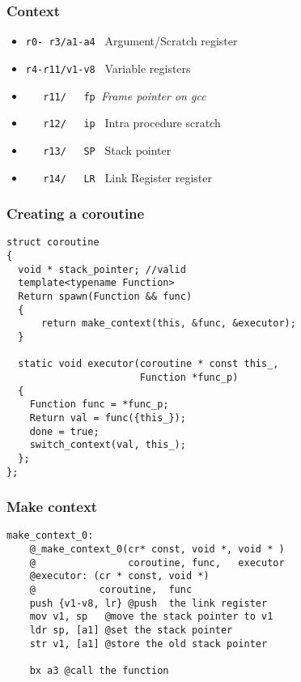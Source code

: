 \documentclass{beamer}
\begin{document}
\begin{frame}[fragile]
\frametitle{Context}
\begin{itemize}
\item<1-> \lstinline[columns=fixed]{r0- r3/a1-a4 } Argument/Scratch register
\item<2-> \lstinline[columns=fixed]{r4-r11/v1-v8 } Variable registers
\item<3-> \lstinline[columns=fixed]{   r11/   fp }\textit{Frame pointer on gcc}
\item<4-> \lstinline[columns=fixed]{   r12/   ip } Intra procedure scratch 
\item<5-> \lstinline[columns=fixed]{   r13/   SP } Stack pointer
\item<6-> \lstinline[columns=fixed]{   r14/   LR } Link Register
register
\end{itemize}
\end{frame}

\begin{frame}[fragile]
\frametitle{Creating a coroutine}

\begin{block}{}
\begin{lstlisting}[basicstyle=\small]
struct coroutine
{
  void * stack_pointer; //valid
  template<typename Function>
  Return spawn(Function && func)
  {
      return make_context(this, &func, &executor);
  }

  static void executor(coroutine * const this_, 
                       Function *func_p)
  {
    Function func = *func_p;
    Return val = func({this_});
    done = true;
    switch_context(val, this_);
  };  
};
\end{lstlisting}
\end{block}
\end{frame}


\begin{frame}[fragile]
\frametitle{Make context}

\begin{block}{}
\begin{lstlisting}[language=ASM, basicstyle=\small]
make_context_0:
    @_make_context_0(cr* const, void *, void * )
    @                coroutine, func,   executor
    @executor: (cr * const, void *)
    @           coroutine,  func
    push {v1-v8, lr} @push  the link register
    mov v1, sp   @move the stack pointer to v1
    ldr sp, [a1] @set the stack pointer
    str v1, [a1] @store the old stack pointer

    bx a3 @call the function

\end{lstlisting}
\end{block}
\end{frame}
\end{document}
